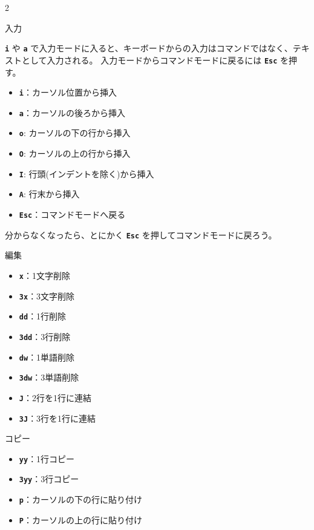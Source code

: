 \begin{multicols}{2}
\begin{cheatbox}{入力}
\begin{small}
\texttt{\bfseries i} や \texttt{\bfseries a} で入力モードに入ると、キーボードからの入力はコマンドではなく、テキストとして入力される。
入力モードからコマンドモードに戻るには \texttt{\bfseries Esc} を押す。
\end{small}
\begin{itemize}
  \item \texttt{\bfseries i}：カーソル位置から挿入
  \item \texttt{\bfseries a}：カーソルの後ろから挿入
  \item \texttt{\bfseries o}: カーソルの下の行から挿入
  \item \texttt{\bfseries O}: カーソルの上の行から挿入
  \item \texttt{\bfseries I}: 行頭(インデントを除く)から挿入
  \item \texttt{\bfseries A}: 行末から挿入
  \item \texttt{\bfseries Esc}：コマンドモードへ戻る
\end{itemize}
\begin{small}
分からなくなったら、とにかく \texttt{\bfseries Esc} を押してコマンドモードに戻ろう。
\end{small}
\end{cheatbox}

\begin{cheatbox}{編集}
\begin{itemize}
  \item \texttt{\bfseries x}：1文字削除
  \item \texttt{\bfseries 3x}：3文字削除
  \item \texttt{\bfseries dd}：1行削除
  \item \texttt{\bfseries 3dd}：3行削除
  \item \texttt{\bfseries dw}：1単語削除
  \item \texttt{\bfseries 3dw}：3単語削除
  \item \texttt{\bfseries J}：2行を1行に連結
  \item \texttt{\bfseries 3J}：3行を1行に連結
\end{itemize}
\end{cheatbox}

\begin{cheatbox}{コピー}
\begin{itemize}
  \item \texttt{\bfseries yy}：1行コピー
  \item \texttt{\bfseries 3yy}：3行コピー
  \item \texttt{\bfseries p}：カーソルの下の行に貼り付け
  \item \texttt{\bfseries P}：カーソルの上の行に貼り付け
\end{itemize}
\end{cheatbox}


\end{multicols}
